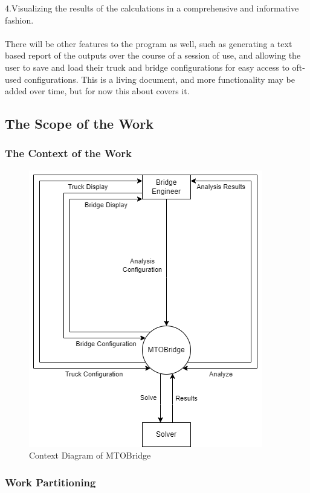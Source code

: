 \documentclass[12pt]{article}
\begin{document}
\noindent 4.Visualizing the results of the calculations in a comprehensive and informative fashion.\\\\

\noindent There will be other features to the program as well, such as generating a text based report of the outputs over the course of a session of use, and allowing the user
to save and load their truck and bridge configurations for easy access to oft-used configurations. This is a living document, and more functionality may be added over time,
but for now this about covers it.

\subsection{The Scope of the Work}

\subsubsection{The Context of the Work}

\begin{figure}[H]
  \includegraphics[]{context-diagram.png}
  \caption{Context Diagram of MTOBridge}
  \label {fig:context-diagram}
\end{figure}

\subsubsection{Work Partitioning}
\end{document}
